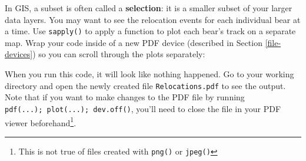 \documentclass[]{book}
\newenvironment{Shaded}{\begin{snugshade}}{\end{snugshade}}
\newcommand{\KeywordTok}[1]{\textcolor[rgb]{0.13,0.29,0.53}{\textbf{#1}}}
\newcommand{\DataTypeTok}[1]{\textcolor[rgb]{0.13,0.29,0.53}{#1}}
\newcommand{\DecValTok}[1]{\textcolor[rgb]{0.00,0.00,0.81}{#1}}
\newcommand{\FloatTok}[1]{\textcolor[rgb]{0.00,0.00,0.81}{#1}}
\newcommand{\StringTok}[1]{\textcolor[rgb]{0.31,0.60,0.02}{#1}}
\newcommand{\CommentTok}[1]{\textcolor[rgb]{0.56,0.35,0.01}{\textit{#1}}}
\newcommand{\ControlFlowTok}[1]{\textcolor[rgb]{0.13,0.29,0.53}{\textbf{#1}}}
\newcommand{\OperatorTok}[1]{\textcolor[rgb]{0.81,0.36,0.00}{\textbf{#1}}}
\newcommand{\NormalTok}[1]{#1}
\let\rmarkdownfootnote\footnote%
\def\footnote{\protect\rmarkdownfootnote}
\theoremstyle{definition}
\theoremstyle{definition}
\theoremstyle{definition}
\theoremstyle{remark}
\begin{document}
In GIS, a subset is often called a \textbf{selection}: it is a smaller
subset of your larger data layers. You may want to see the relocation
events for each individual bear at a time. Use \texttt{sapply()} to
apply a function to plot each bear's track on a separate map. Wrap your
code inside of a new PDF device (described in Section
\ref{file-devices}) so you can scroll through the plots separately:

\begin{Shaded}
\end{Shaded}

When you run this code, it will look like nothing happened. Go to your
working directory and open the newly created file
\texttt{Relocations.pdf} to see the output. Note that if you want to
make changes to the PDF file by running
\texttt{pdf(...);\ plot(...);\ dev.off()}, you'll need to close the file
in your PDF viewer beforehand\footnote{This is not true of files created
  with \texttt{png()} or \texttt{jpeg()}}.
\end{document}
